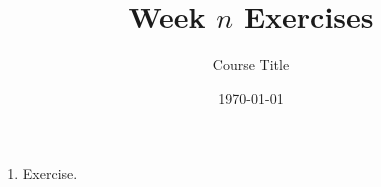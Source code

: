 \documentclass[style=exercises]{tablet}
\title{Week $n$ Exercises}
\author{Course Title}
\date{\today}
\begin{document}
\maketitle
\def\subbib{}
\setcounter{section}{1}
\begin{enumerate}
    \item Exercise.
\end{enumerate}
\end{document}
